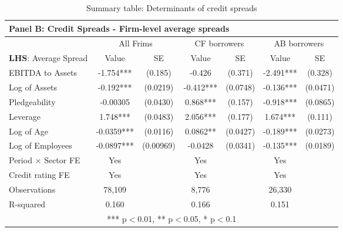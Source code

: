 \documentclass[12pt]{article}
\begin{document}
\begin{table}[H]
{\begin{tabular}{lcccccc}
    \multicolumn{7}{l}{Panel B: \textbf{Credit Spreads - Firm-level average spreads}} \\    
    \toprule
    & \multicolumn{2}{c}{All Frims} & \multicolumn{2}{c}{CF borrowers} & \multicolumn{2}{c}{AB borrowers} \\
    \cmidrule(lr){2-3} \cmidrule(lr){4-5} \cmidrule(lr){6-7}
    \textbf{LHS}: Average Spread & Value & SE & Value & SE & Value & SE \\
    \midrule
    EBITDA to Assets & -1.754*** & (0.185) & -0.426 & (0.371) & -2.491*** & (0.328) \\
    Log of Assets & -0.192*** & (0.0219) & -0.412*** & (0.0748) & -0.136*** & (0.0471) \\
    Pledgeability & -0.00305 & (0.0430) & 0.868*** & (0.157) & -0.918*** & (0.0865) \\
    Leverage & 1.748*** & (0.0483) & 2.056*** & (0.177) & 1.674*** & (0.111) \\
    Log of Age & -0.0359*** & (0.0116) & 0.0862** & (0.0427) & -0.189*** & (0.0273) \\
    Log of Employees & -0.0897*** & (0.00969) & -0.0428 & (0.0341) & -0.135*** & (0.0189) \vspace{2mm} \\
    \midrule
    Period $\times$ Sector FE & Yes & & Yes & & Yes & \\
    Credit rating FE & Yes & & Yes & & Yes & \\
    Observations & 78,109 & & 8,776 & & 26,330 & \\
    R-squared & 0.160 & & 0.166 & & 0.151 & \\
    \bottomrule
    \multicolumn{7}{c}{*** p$<$0.01, ** p$<$0.05, * p$<$0.1} \\
    \end{tabular}%
    }
    \caption{Summary table: Determinants of credit spreads}
\end{table}
\noindent 
\end{document}
